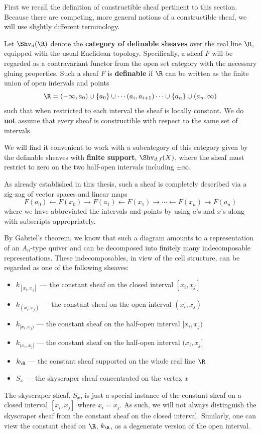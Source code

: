 First we recall the definition of constructible sheaf pertinent to this section. Because there are competing, more general notions of a constructible sheaf, we will use slightly different terminology.

\begin{defn}
Let $\Shv_d(\R)$ denote the \textbf{category of definable sheaves} over the real line $\R$, equipped with the usual Euclidean topology. Specifically, a sheaf $F$ will be regarded as a contravariant functor from the open set category with the necessary gluing properties. Such a sheaf $F$ is \textbf{definable} if $\R$ can be written as the finite union of open intervals and points 
\[
\R=(-\infty,a_0)\cup \{a_0\}\cup \cdots (a_i,a_{i+1}) \cdots \cup \{a_n\} \cup (a_n,\infty)
\]
such that when restricted to each interval the sheaf is locally constant. We do \textbf{not} assume that every sheaf is constructible with respect to the same set of intervals.

We will find it convenient to work with a subcategory of this category given by the definable sheaves with \textbf{finite support}, $\Shv_{d,f}(X)$, where the sheaf must restrict to zero on the two half-open intervals including $\pm\infty$.
\end{defn}

As already established in this thesis, such a sheaf is completely described via a zig-zag of vector spaces and linear maps
\[
F(a_0)\leftarrow F(x_0) \rightarrow F(a_1) \leftarrow F(x_1)\rightarrow \cdots \leftarrow F(x_n) \rightarrow F(a_n)
\]
where we have abbreviated the intervals and points by using $a$'s and $x$'s along with subscripts appropriately.

By Gabriel's theorem, we know that such a diagram amounts to a representation of an $A_n$-type quiver and can be decomposed into finitely many indecomposable representations. These indecomposables, in view of the cell structure, can be regarded as one of the following sheaves:
\begin{itemize}
\item $k_{[x_i,x_j]}$ --- the constant sheaf on the closed interval $[x_i,x_j]$
\item $k_{(x_i,x_j)}$ --- the constant sheaf on the open interval $(x_i,x_j)$
\item $k_{[x_i,x_j)}$ --- the constant sheaf on the half-open interval $[x_i,x_j)$
\item $k_{(x_i,x_j]}$ --- the constant sheaf on the half-open interval $(x_i,x_j]$
\item $k_{\R}$ --- the constant sheaf supported on the whole real line $\R$
\item $S_x$ --- the skyscraper sheaf concentrated on the vertex $x$
\end{itemize}
The skyscraper sheaf, $S_x$, is just a special instance of the constant sheaf on a closed interval $[x_i,x_j]$ where $x_i=x_j$. As such, we will not always distinguish the skyscraper sheaf from the constant sheaf on the closed interval. Similarly, one can view the constant sheaf on $\R$, $k_{\R}$, as a degenerate version of the open interval. 

